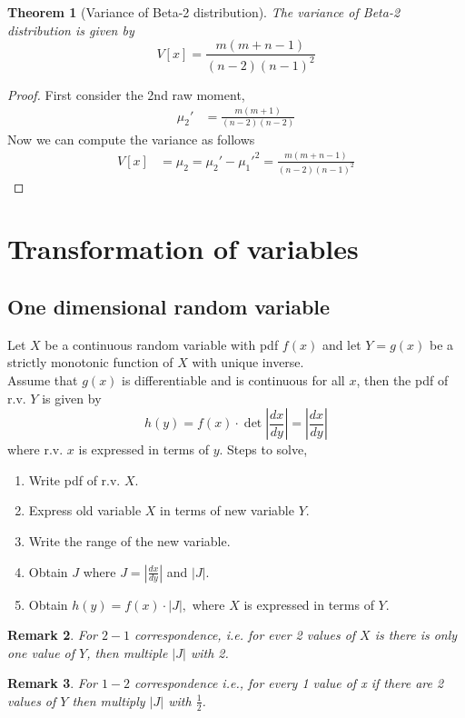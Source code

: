 \documentclass[oneside,11pt,pdftex]{book}%
\numberwithin{equation}{section}
\newtheorem{theorem}{Theorem}[chapter]%
\newtheorem{remark}[theorem]{Remark}
\numberwithin{section}{chapter}
\numberwithin{equation}{chapter}
\begin{document}
\begin{theorem}[Variance of Beta-2 distribution]
	The variance of Beta-2 distribution is given by \[ V[x]=\frac{m(m+n-1)}{(n-2)(n-1)^2} \]
\end{theorem}
\begin{proof}
	First consider the 2nd raw moment,
	\begin{align*}
		\mu_2'&=\frac{m(m+1)}{(n-2)(n-2)}
	\end{align*}
	Now we can compute the variance as follows
	\begin{align*}
		V[x]&=\mu_2=\mu_2'-\mu_1'^2=\frac{m(m+n-1)}{(n-2)(n-1)^2}
	\end{align*}
\end{proof}

\section{Transformation of variables}
\subsection{One dimensional random variable}
Let $ X $ be a continuous random variable with pdf $ f(x) $ and let $ Y=g(x) $ be a strictly monotonic function of $ X $ with unique inverse.\\
Assume that $ g(x) $ is differentiable and is continuous for all $ x $, then the pdf of r.v. $ Y $ is given by 
\[ h(y)=f(x) \cdot \det \left|\frac{dx}{dy}\right| = \left|\frac{dx}{dy}\right|\]
where r.v. $ x $ is expressed in terms of $ y $.
Steps to solve,
\begin{enumerate}
	\item Write pdf of r.v. $ X $.
	\item Express old variable $ X $ in terms of new variable $ Y $.
	\item Write the range of the new variable.
	\item Obtain $ J $ where $ J=\left|\frac{dx}{dy}\right| $ and $ |J| $.
	\item Obtain $ h(y) =f(x)\cdot |J|,$ where $ X $ is expressed in terms of $ Y. $
\end{enumerate}
\begin{remark}
		For $ 2-1 $ correspondence, i.e. for ever 2 values of $ X $ is there is only one value of $ Y $, then multiple $ |J| $ with 2.
\end{remark}
\begin{remark}
	\item For $ 1-2 $ correspondence i.e., for every 1 value of x if there are 2 values of $ Y $ then multiply $|J| $ with $ \frac{1}{2} $.
\end{remark}
\end{document}
